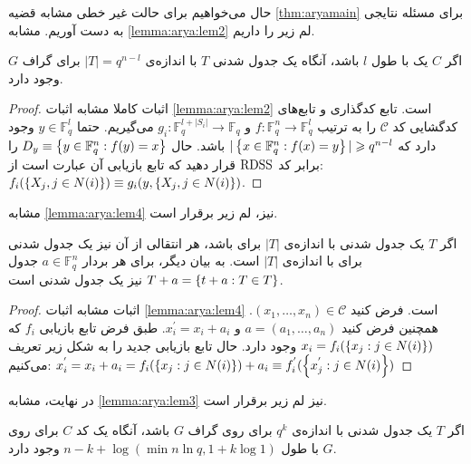 حال می‌خواهیم برای حالت غیر خطی مشابه قضیه
 \autoref{thm:aryamain}
برای مسئله
\picod
نتایجی به دست آوریم. مشابه
 \autoref{lemma:arya:lem2}
 لم زیر را داریم.
\begin{lemma}
	\label{lamma:our:lemma2}
	اگر
	$C$
	یک \picod با طول
	$l$
	باشد، آنگاه یک جدول شدنی
	$T$
	با اندازه‌ی
	$|T| = q^{n - l}$
	برای گراف
	$G$
	وجود دارد.
\end{lemma}
\begin{proof}
	اثبات کاملا مشابه اثبات
	\autoref{lemma:arya:lem2}
	است. تابع کدگذاری و تابع‌های کدگشایی کد
	$\mathcal{C}$
	را به ترتیب
	$f: \mathbb{F}_q^n \rightarrow \mathbb{F}_q^l$
	و
	$g_i: \mathbb{F}_q^{l + |S_i|} \rightarrow \mathbb{F}_q$
	می‌گیریم. حتما
	$y \in \mathbb{F}_q^{l}$
	وجود دارد که
	$|\left\{ x \in \mathbb{F}_q^n: f(x) = y \right\}| \geqslant q^{n - l}$
	باشد. حال
	$D_y \equiv \left\{ y \in \mathbb{F}_q^n: f(y) = x \right\}$
	را برابر کد
	$\mathrm{RDSS}$
	قرار دهید که تابع بازیابی آن عبارت است از:
	$f_i(\left\{ X_j, j \in N(i) \right\}) \equiv g_i(y, \left\{ X_j, j \in N(i) \right\})$.
\end{proof}
مشابه
\autoref{lemma:arya:lem4}
نیز، لم زیر برقرار است.
\begin{lemma}
	\label{lemma:our:lemma4}
	اگر
	$T$
	یک جدول شدنی با اندازه‌ی
	$|T|$
	 برای 
	\psicod
	باشد، هر انتقالی از آن نیز یک جدول شدنی برای
	\psicod
	با اندازه‌ی $|T|$ است. به بیان دیگر، برای هر بردار
	$a \in \mathbb{F}_q^n$
	جدول
	$T + a = \left\{ t + a: T \in T \right\}$
	نیز یک جدول شدنی است.
\end{lemma}
\begin{proof}
	اثبات مشابه اثبات
	\autoref{lemma:arya:lem4}
	است.
	فرض کنید
	$(x_1, \ldots, x_n) \in \mathcal{C}$.
	همچنین فرض کنید
	$a = (a_1, \dots,  a_n)$
	و
	$x_i^{'} = x_i + a_i$.
	طبق فرض تابع بازیابی
	$f_i$
	که
	$x_i = f_i(\left\{ x_j: j \in N(i) \right\})$
	وجود دارد. حال تابع بازیابی جدید را به شکل زیر تعریف می‌کنیم:
	$x_i^{'} = x_i +a_i = f_i(\left\{ x_j: j \in N(i) \right\}) + a_i \equiv f_i^{'}(\left\{ x_j^{'}: j \in N(i) \right\})$
\end{proof}
در نهایت، مشابه
\autoref{lemma:arya:lem3}
نیز لم زیر برقرار است.
\begin{lemma}
	\label{lemma:our:lemma3}
	اگر
	$T$
	یک جدول شدنی با اندازه‌ی
	$q^k$
	برای 
	\psicod
	روی گراف
	$G$
	باشد، آنگاه یک کد
	$C$
	برای
	\picod
	روی 
	$G$
	با طول
	$n - k + \log(\min{n \ln q, 1 + k \log 1})$
	وجود دارد.
\end{lemma}
